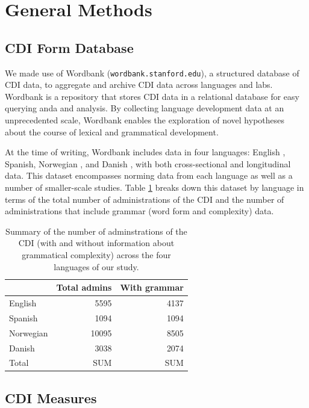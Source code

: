 \documentclass[10pt,letterpaper]{article}
\begin{document}
\section{General Methods}

\subsection{CDI Form Database}

We made use of Wordbank (\texttt{wordbank.stanford.edu}), a structured database of CDI data, to aggregate and archive CDI data across languages and labs. Wordbank is a repository that stores CDI data in a relational database for easy querying anda and analysis. By collecting language development data at an unprecedented scale, Wordbank enables the exploration of novel hypotheses about the course of lexical and grammatical development. 

At the time of writing, Wordbank includes data in four languages: English \cite{fenson2007}, Spanish, Norwegian \cite{simonsen2014}, and Danish \cite{bleses2008}, with both cross-sectional and longitudinal data. This dataset encompasses norming data from each language as well as a number of smaller-scale studies. Table \ref{table:num} breaks down this dataset by language in terms of the total number of administrations of the CDI and the number of administrations that include grammar (word form and complexity) data.


\begin{table}[t]
\begin{center}
\begin{tabular}{lrr}
\hline
& Total admins & With grammar\\ 
\hline
English & 5595 & 4137\\ 
Spanish & 1094 & 1094\\ 
Norwegian & 10095 & 8505\\ 
Danish & 3038 & 2074\\ 
\hline
Total & SUM & SUM \\
\hline
\end{tabular}
\end{center}
\caption{\label{table:num} Summary of the number of adminstrations of the CDI (with and without information about grammatical complexity) across the four languages of our study.}
\end{table}

\subsection{CDI Measures}
\end{document}
